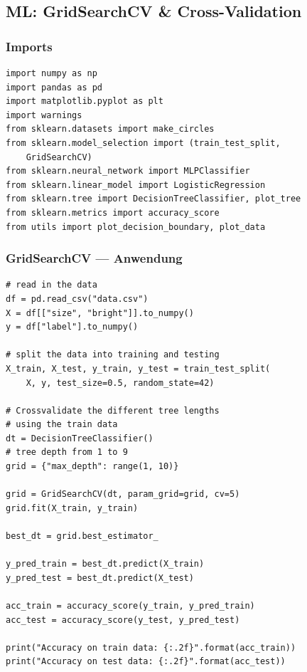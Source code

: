 \subsection{ML: GridSearchCV \& Cross-Validation}\label{sec:12-ml-cross-validation}

\subsubsection{Imports}
\begin{codebox}
\begin{lstlisting}[style=CodeExpert]
import numpy as np
import pandas as pd
import matplotlib.pyplot as plt
import warnings
from sklearn.datasets import make_circles
from sklearn.model_selection import (train_test_split,
    GridSearchCV)
from sklearn.neural_network import MLPClassifier
from sklearn.linear_model import LogisticRegression
from sklearn.tree import DecisionTreeClassifier, plot_tree
from sklearn.metrics import accuracy_score
from utils import plot_decision_boundary, plot_data

\end{lstlisting}
\end{codebox}

\subsubsection{GridSearchCV — Anwendung}
\begin{codebox}
\begin{lstlisting}[style=CodeExpert]
# read in the data
df = pd.read_csv("data.csv")
X = df[["size", "bright"]].to_numpy()
y = df["label"].to_numpy()

# split the data into training and testing
X_train, X_test, y_train, y_test = train_test_split(
    X, y, test_size=0.5, random_state=42)

# Crossvalidate the different tree lengths
# using the train data
dt = DecisionTreeClassifier()
# tree depth from 1 to 9
grid = {"max_depth": range(1, 10)}

grid = GridSearchCV(dt, param_grid=grid, cv=5)
grid.fit(X_train, y_train)

best_dt = grid.best_estimator_

y_pred_train = best_dt.predict(X_train)
y_pred_test = best_dt.predict(X_test)

acc_train = accuracy_score(y_train, y_pred_train)
acc_test = accuracy_score(y_test, y_pred_test)

print("Accuracy on train data: {:.2f}".format(acc_train))
print("Accuracy on test data: {:.2f}".format(acc_test))
\end{lstlisting}
\end{codebox}

